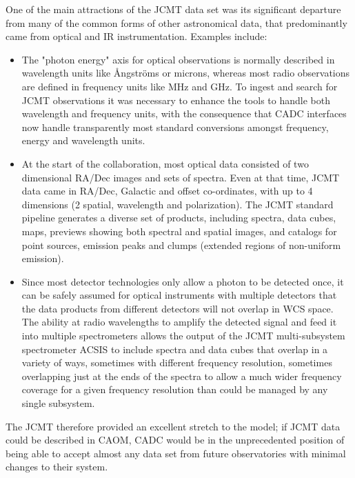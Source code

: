 \documentclass[final,authoryear,5p,times,twocolumn]{elsarticle}
\begin{document}
One of the main attractions of the JCMT data set was its significant
departure from many of the common forms of other astronomical data,
that predominantly came from optical and IR instrumentation.
Examples include:
\begin{itemize}
\item The "photon energy" axis for optical observations is normally described in wavelength
units like \AA{}ngstr\"{o}ms or microns, whereas most radio observations are defined in
frequency units like MHz and GHz.  To ingest and search for JCMT observations
it was necessary to enhance the tools to handle both wavelength and frequency units, with the
consequence that CADC interfaces now handle transparently most standard conversions
amongst frequency, energy and wavelength units.

\item At the start of the collaboration, most optical
data consisted of two dimensional RA/Dec images and sets of spectra.  Even at that time, JCMT data
came in RA/Dec, Galactic and offset co-ordinates, with up to 4 dimensions (2
spatial, wavelength and polarization).  The JCMT standard pipeline generates a
diverse set of products, including spectra, data cubes, maps, previews showing both spectral
and spatial images,  and catalogs for point sources, emission peaks and
clumps (extended regions of non-uniform emission).

\item Since most detector technologies only allow a photon to be
detected once, it can be safely assumed for optical instruments with multiple detectors
that the data products from different detectors will not overlap in WCS space.  The ability
at radio wavelengths to amplify the detected signal and feed it into multiple
spectrometers allows the output of the JCMT multi-subsystem spectrometer ACSIS
to include spectra and data cubes that overlap in a variety of ways, sometimes with
different frequency resolution, sometimes overlapping just at the ends of the spectra
to allow a much wider frequency coverage for a given frequency resolution than could be managed
by any single subsystem.
\end{itemize}

The JCMT therefore
provided an excellent stretch to the model; if JCMT data could be
described in CAOM, CADC would be in the unprecedented position of
being able to accept almost any data set from future observatories
with minimal changes to their system.
\end{document}
